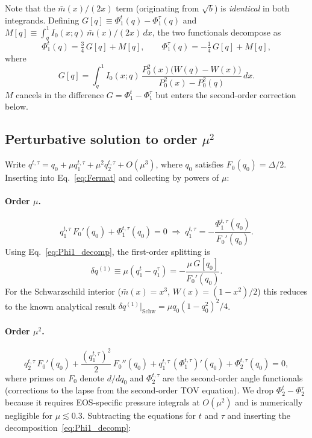 Note that the $\bar{m}(x)/(2x)$ term (originating from $\sqrt{b}$) is
\emph{identical} in both integrands.
Defining $G[q] \equiv \Phi_1^t(q) - \Phi_1^\tau(q)$ and
$M[q] \equiv \int_q^1 I_0(x;q)\,\bar{m}(x)/(2x)\,dx$, the two
functionals decompose as
\begin{equation}
    \Phi_1^t(q) = \tfrac{3}{4}\,G[q] + M[q],
    \qquad
    \Phi_1^\tau(q) = -\tfrac{1}{4}\,G[q] + M[q],
    \label{eq:Phi1_decomp}
\end{equation}
where
\begin{equation}
    G[q] = \int_q^1 I_0(x;q)\,
    \frac{P_0^2(x)\bigl(W(q)-W(x)\bigr)}{P_0^2(x)-P_0^2(q)}\,dx.
    \label{eq:G_functional}
\end{equation}
$M$ cancels in the difference $G = \Phi_1^t - \Phi_1^\tau$ but enters
the second-order correction below.

\subsection{Perturbative solution to order $\mu^2$}

Write $q^{t,\tau} = q_0 + \mu q_1^{t,\tau} + \mu^2 q_2^{t,\tau} + O(\mu^3)$,
where $q_0$ satisfies $F_0(q_0) = \Delta/2$.
Inserting into Eq.~\eqref{eq:Fermat} and collecting by powers of $\mu$:

\paragraph{Order $\mu$.}
\begin{equation}
    q_1^{t,\tau}\,F_0'(q_0) + \Phi_1^{t,\tau}(q_0) = 0
    \;\Longrightarrow\;
    q_1^{t,\tau} = -\frac{\Phi_1^{t,\tau}(q_0)}{F_0'(q_0)}.
\end{equation}
Using Eq.~\eqref{eq:Phi1_decomp}, the first-order splitting is
\begin{equation}
    \delta q^{(1)} \equiv \mu(q_1^t - q_1^\tau)
    = -\frac{\mu\,G[q_0]}{F_0'(q_0)}.
    \label{eq:dq1}
\end{equation}
For the Schwarzschild interior ($\bar{m}(x)=x^3$, $W(x)=(1-x^2)/2$) this
reduces to the known analytical result
$\delta q^{(1)}\big|_\mathrm{Schw} = \mu q_0(1-q_0^2)^2/4$.

\paragraph{Order $\mu^2$.}
\begin{equation}
    q_2^{t,\tau}\,F_0'(q_0)
    + \frac{(q_1^{t,\tau})^2}{2}\,F_0''(q_0)
    + q_1^{t,\tau}\,(\Phi_1^{t,\tau})'(q_0)
    + \Phi_2^{t,\tau}(q_0) = 0,
    \label{eq:q2_eq}
\end{equation}
where primes on $F_0$ denote $d/dq_0$ and $\Phi_2^{t,\tau}$ are the
second-order angle functionals (corrections to the lapse from the
second-order TOV equation).
We drop $\Phi_2^t - \Phi_2^\tau$ because it requires EOS-specific pressure
integrals at $O(\mu^2)$ and is numerically negligible for $\mu \lesssim 0.3$.
Subtracting the equations for $t$ and $\tau$ and inserting the
decomposition~\eqref{eq:Phi1_decomp}:

